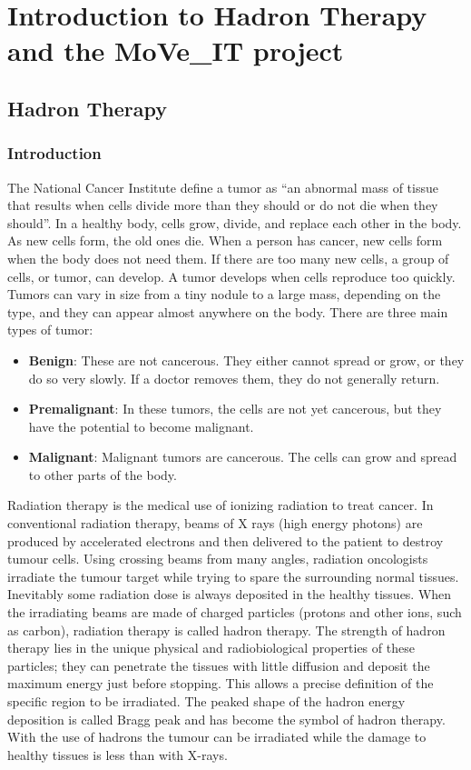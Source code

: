 \part{Introduction to Hadron Therapy and the MoVe\_IT project}
\pagestyle{fancy}
\chapter{Hadron Therapy}

\section{Introduction}
The National Cancer Institute define a tumor\cite{tumor} as “an abnormal mass of tissue that results when cells divide more than they should or do not die when they should”.
In a healthy body, cells grow, divide, and replace each other in the body. As new cells form, the old ones die. When a person has cancer, new cells form when the body does not need them. If there are too many new cells, a group of cells, or tumor, can develop.
A tumor develops when cells reproduce too quickly. Tumors can vary in size from a tiny nodule to a large mass, depending on the type, and they can appear almost anywhere on the body.
There are three main types of tumor:
\begin{itemize}
\item \textbf{Benign}: These are not cancerous. They either cannot spread or grow, or they do so very slowly. If a doctor removes them, they do not generally return.
\item \textbf{Premalignant}: In these tumors, the cells are not yet cancerous, but they have the potential to become malignant.
\item \textbf{Malignant}: Malignant tumors are cancerous. The cells can grow and spread to other parts of the body.
\end{itemize}
Radiation therapy is the medical use of ionizing radiation to treat cancer. In conventional radiation therapy, beams of X rays (high energy photons) are produced by accelerated electrons and then delivered to the patient to destroy tumour cells. Using crossing beams from many angles, radiation oncologists irradiate the tumour target while trying to spare the surrounding normal tissues. Inevitably some radiation dose is always deposited in the healthy tissues.
When the irradiating beams are made of charged particles (protons and other ions, such as carbon), radiation therapy is called hadron therapy\cite{radiationtherapy}. The strength of hadron therapy lies in the unique physical and radiobiological properties of these particles; they can penetrate the tissues with little diffusion and deposit the maximum energy just before stopping. This allows a precise definition of the specific region to be irradiated. The peaked shape of the hadron energy deposition is called Bragg peak and has become the symbol of hadron therapy. With the use of hadrons the tumour can be irradiated while the damage to healthy tissues is less than with X-rays.

